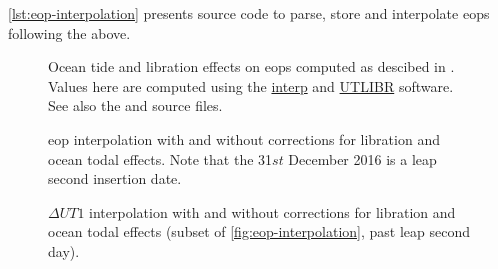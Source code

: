 \autoref{lst:eop-interpolation} presents source code to parse, store and 
interpolate \glspl{eop} following the above.

\begin{figure}[h]
  \centering
  
  \caption{Ocean tide and libration effects on \glspl{eop} computed as descibed in \cite{iers2010}. 
    Values here are computed using the \protect\href{https://hpiers.obspm.fr/iers/models/interp.f}{interp} and 
    \protect\href{https://iers-conventions.obspm.fr/content/chapter5/software/UTLIBR.F}{UTLIBR} software. 
    See also the  and  
    source files.}
  \label{fig:eop-variations}
\end{figure}

\begin{figure}[h]
  \centering
  
  \caption{\gls{eop} interpolation with and without corrections for libration and ocean todal effects. Note that the 31$st$ December 2016 is a leap second insertion date.}
  \label{fig:eop-interpolation}
\end{figure}

\begin{figure}[h]
  \centering
  
  \caption{$\Delta UT1$ interpolation with and without corrections for libration and ocean todal effects (subset of \autoref{fig:eop-interpolation}, past leap second day).}
  \label{fig:eop-interpolation-dut1}
\end{figure}

\begin{minipage}{\linewidth}
  
\end{minipage}

